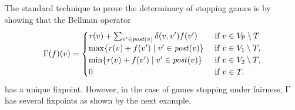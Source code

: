 



The standard technique to prove the determinacy of stopping games is by showing that the Bellman operator
%
\[
    \Gamma(f)(v) =
    \begin{cases}
           \mathit{r}(v)  + \sum_{v' \in \mathit{post}(v)} \delta(v,v')  f(v') & \text{ if } v \in V_{\mathsf{P}} \setminus T  \\
          \max \{\mathit{r}(v)  + f(v') \mid v' \in \mathit{post}(v) \}& \text{ if } v \in  V_1 \setminus T, \\
           \min \{\mathit{r}(v)  + f(v') \mid v' \in \mathit{post}(v) \} & \text{ if } v \in  V_2 \setminus T, \\
           0 & \text{ if } v \in T.
    \end{cases}
\]
%
has a unique fixpoint. However, in the case of games stopping under fairness,  $\Gamma$ has several fixpoints as shown by the next example.

